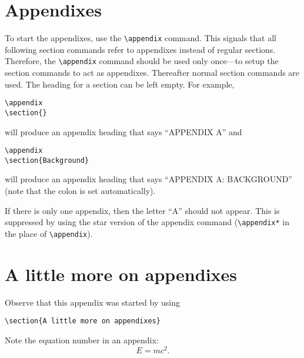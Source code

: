 \documentclass[%
 reprint,
 amsmath,amssymb,
 aps,
]{revtex4-2}
\begin{document}
\appendix



\section{Appendixes}

To start the appendixes, use the \verb+\appendix+ command.
This signals that all following section commands refer to appendixes
instead of regular sections. Therefore, the \verb+\appendix+ command
should be used only once---to setup the section commands to act as
appendixes. Thereafter normal section commands are used. The heading
for a section can be left empty. For example,
\begin{verbatim}
\appendix
\section{}
\end{verbatim}
will produce an appendix heading that says ``APPENDIX A'' and
\begin{verbatim}
\appendix
\section{Background}
\end{verbatim}
will produce an appendix heading that says ``APPENDIX A: BACKGROUND''
(note that the colon is set automatically).

If there is only one appendix, then the letter ``A'' should not
appear. This is suppressed by using the star version of the appendix
command (\verb+\appendix*+ in the place of \verb+\appendix+).

\section{A little more on appendixes}

Observe that this appendix was started by using
\begin{verbatim}
\section{A little more on appendixes}
\end{verbatim}

Note the equation number in an appendix:
\begin{equation}
  E=mc^2.
\end{equation}
\end{document}
